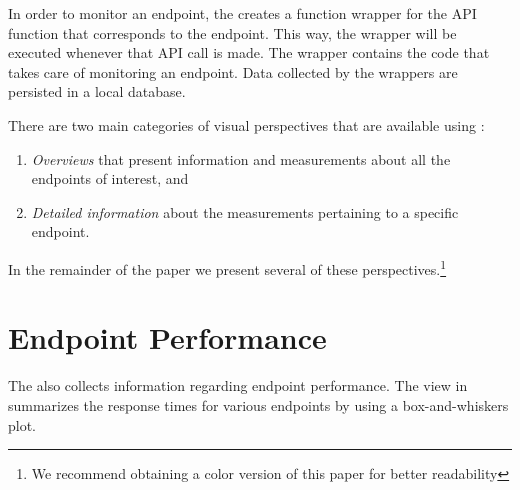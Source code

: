 \documentclass[conference]{IEEEtran}
\begin{document}
  In order to monitor an endpoint, the \tool creates a function wrapper for the API function that corresponds to the endpoint. This way, the wrapper will be executed whenever that API call is made. The wrapper contains the code that takes care of monitoring an endpoint. Data collected by the wrappers are persisted in a local database.

  There are two main categories of visual perspectives that are available using \tool:
  \begin{enumerate}
    \item \textit{Overviews} that present information and measurements about all the endpoints of interest, and
    \item \textit{Detailed information} about the measurements pertaining to a specific endpoint.
  \end{enumerate}

  In the remainder of the paper we present several of these perspectives.\footnote{We recommend obtaining a color version of this paper for better readability}






\section{Endpoint Performance}
\label{sec:perf}

  The \tool also collects information regarding endpoint performance. The view in  summarizes the response times for various endpoints by using a box-and-whiskers plot. 
\end{document}
